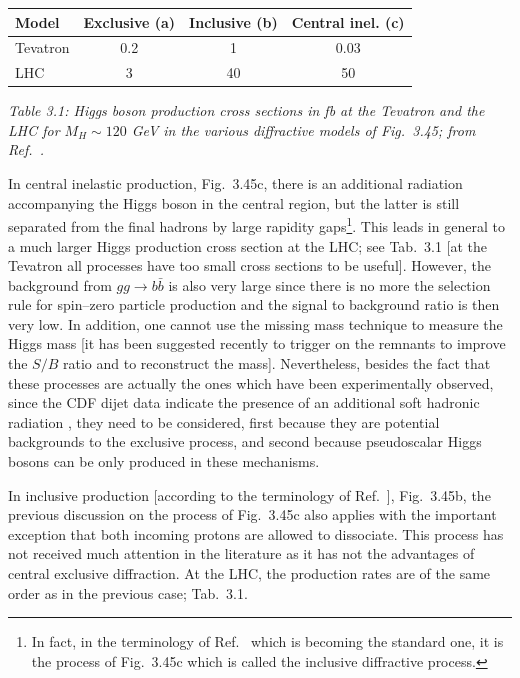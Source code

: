 \begin{table}[h]
\renewcommand{\arraystretch}{1.3}
\begin{center}
\begin{tabular}{|l||c|c|c|} \hline
Model  & Exclusive (a) & Inclusive (b) & Central inel. (c) \\ \hline
Tevatron &  0.2 & 1  & 0.03 \\
LHC      &  3   & 40 & 50 \\ \hline
\end{tabular}
\end{center}
{\it Table 3.1: Higgs boson production cross sections in fb at the Tevatron and the LHC for $M_H \sim 120$ GeV in the various diffractive models of Fig.~3.45;
from Ref.~\cite{Valery-myths}.}
\vspace*{-3mm}
\end{table}

In central inelastic production, Fig.~3.45c, there is an additional radiation
accompanying the Higgs boson in the central region, but the latter is still
separated from the final hadrons by large rapidity gaps\footnote{In fact, in
the terminology of Ref.~\cite{Robi-Diff} which is becoming the standard one, it
is the process of Fig.~3.45c which is called the inclusive diffractive
process.}.  This leads in general to a much larger Higgs production cross
section at the LHC; see Tab.~3.1 [at the Tevatron all processes have too small
cross sections to be useful]. However, the background from $gg \to b\bar b$ is
also very large since there is no more the selection rule for spin--zero
particle production and the signal to background ratio is then very low. In
addition, one cannot use the missing mass technique to measure the Higgs 
mass [it has been suggested recently \cite{diff-Peshanski} to trigger on the
remnants to improve the $S/B$ ratio and to reconstruct the mass]. 
Nevertheless, besides the fact that these processes are actually the ones which
have been experimentally observed, since the CDF dijet data indicate the
presence of an additional soft hadronic radiation \cite{CDF-diffr}, they need
to be considered, first because they are potential backgrounds to the exclusive
process, and second because pseudoscalar Higgs bosons can be only produced in
these mechanisms. \s

In inclusive production [according to the terminology of
Ref.~\cite{Valery-myths}], Fig.~3.45b, the previous discussion on the process
of Fig.~3.45c also applies with the important exception that both incoming
protons are allowed to dissociate. This process has not received much attention
in the literature  as it has not the advantages of central exclusive
diffraction.  At the LHC, the production rates \cite{Valery-myths} are of the 
same order as in the previous case; Tab.~3.1.\s 

